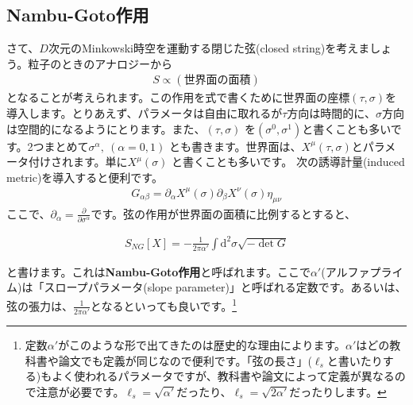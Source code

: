 \documentclass[report,paper=a4, fontsize=12pt, line_length=16cm, number_of_lines=33,dvipdfmx]{jlreq}
\newenvironment{important}{\begin{tcolorbox}[
  colback = white,
  colframe = red!35,
  boxrule = 2mm,
  fonttitle = \bfseries,
  after = \noindent] }{\end{tcolorbox}}
\numberwithin{equation}{chapter}
\numberwithin{equation}{section}
\newcommand{\del}{\partial}
\newcommand{\kyou}[1]{{\sffamily \bfseries #1}}
\newcommand{\di}{\mathrm{d}}
\begin{document}
\subsection{Nambu-Goto作用}
さて、$D$次元のMinkowski時空を運動する閉じた弦(closed string)を考えましょう。粒子のときのアナロジーから
\begin{align}
 S \propto (\text{世界面の面積})
\end{align}
となることが考えられます。この作用を式で書くために世界面の座標$(\tau,\sigma)$を導入します。とりあえず、パラメータは自由に取れるが$\tau$方向は時間的に、$\sigma$方向 は空間的になるようにとります。また、$(\tau,\sigma)$ を$(\sigma^0,\sigma^1)$と書くことも多いです。2つまとめて$\sigma^{\alpha},\ (\alpha=0,1)$ とも書きます。世界面は、$X^{\mu}(\tau,\sigma)$とパラメータ付けされます。単に$X^{\mu}(\sigma)$ と書くことも多いです。
次の誘導計量(induced metric)を導入すると便利です。
\begin{align} G_{\alpha\beta}=\del_{\alpha}X^{\mu}(\sigma)\del_{\beta}X^{\nu}(\sigma)\eta_{\mu\nu}
\end{align}
ここで、$\del_{\alpha}=\frac{\del}{\del\sigma^{\alpha}}$です。弦の作用が世界面の面積に比例するとすると、
\begin{important}
  \begin{align}
    S_{NG}[X]=-\frac{1}{2\pi\alpha'}\int \di^2\sigma
   \sqrt{-\det G}\label{NG}
   \end{align}     
\end{important}
と書けます。これは\kyou{Nambu-Goto作用}と呼ばれます。ここで$\alpha'$(アルファプライム)は「スロープパラメータ(slope parameter)」と呼ばれる定数です。あるいは、弦の張力は、$\frac{1}{2\pi\alpha'}$となるといっても良いです。\footnote{定数$\alpha'$がこのような形で出てきたのは歴史的な理由によります。$\alpha'$はどの教科書や論文でも定義が同じなので便利です。「弦の長さ」($\ell_s$と書いたりする)もよく使われるパラメータですが、教科書や論文によって定義が異なるので注意が必要です。$\ell_s=\sqrt{\alpha'}$だったり、$\ell_s=\sqrt{2\alpha'}$だったりします。
}
\end{document}
